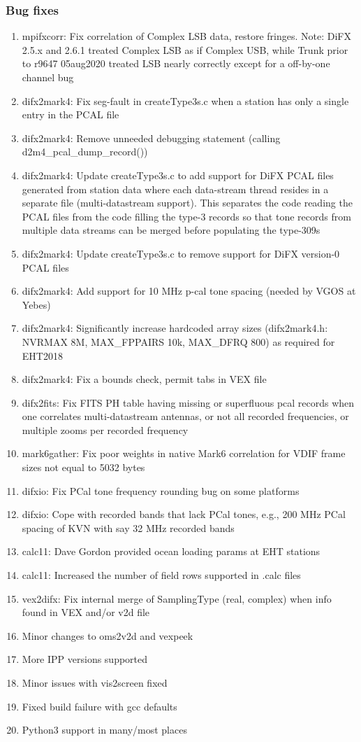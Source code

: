 \subsubsection{Bug fixes}
\begin{enumerate}
\item mpifxcorr: Fix correlation of Complex LSB data, restore fringes. Note: DiFX 2.5.x and 2.6.1 treated Complex LSB as if Complex USB, while Trunk prior to r9647 05aug2020 treated LSB nearly correctly except for a off-by-one channel bug
\item difx2mark4: Fix seg-fault in createType3s.c when a station has only a single entry in the PCAL file
\item difx2mark4: Remove unneeded debugging statement (calling d2m4\_pcal\_dump\_record())
\item difx2mark4: Update createType3s.c to add support for DiFX PCAL files generated from station data where each data-stream thread resides in a separate file (multi-datastream support). This separates the code reading the PCAL files from the code filling the type-3 records so that tone records from multiple data streams can be merged before populating the type-309s
\item difx2mark4: Update createType3s.c to remove support for DiFX version-0 PCAL files
\item difx2mark4: Add support for 10 MHz p-cal tone spacing (needed by VGOS at Yebes)
\item difx2mark4: Significantly increase hardcoded array sizes (difx2mark4.h: NVRMAX 8M, MAX\_FPPAIRS 10k, MAX\_DFRQ 800) as required for EHT2018
\item difx2mark4: Fix a bounds check, permit tabs in VEX file
\item difx2fits: Fix FITS PH table having missing or superfluous pcal records when one correlates multi-datastream antennas, or not all recorded frequencies, or multiple zooms per recorded frequency
\item mark6gather: Fix poor weights in native Mark6 correlation for VDIF frame sizes not equal to 5032 bytes
\item difxio: Fix PCal tone frequency rounding bug on some platforms
\item difxio: Cope with recorded bands that lack PCal tones, e.g., 200 MHz PCal spacing of KVN with say 32 MHz recorded bands
\item calc11: Dave Gordon provided ocean loading params at EHT stations
\item calc11: Increased the number of field rows supported in .calc files
\item vex2difx: Fix internal merge of SamplingType (real, complex) when info found in VEX and/or v2d file
\item Minor changes to oms2v2d and vexpeek
\item More IPP versions supported
\item Minor issues with vis2screen fixed
\item Fixed build failure with gcc defaults
\item Python3 support in many/most places
\end{enumerate}

